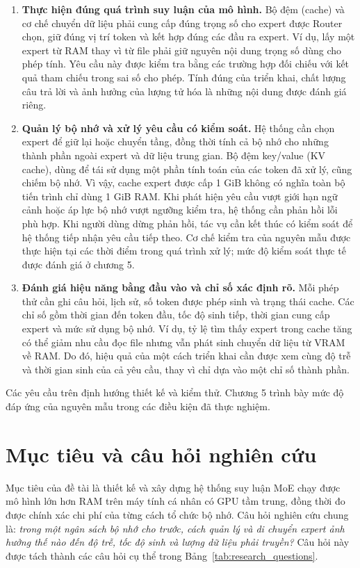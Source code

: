 \begin{enumerate}
\item \textbf{Thực hiện đúng quá trình suy luận của mô hình.} Bộ đệm (cache) và cơ chế chuyển dữ liệu phải cung cấp đúng trọng số cho expert được Router chọn, giữ đúng vị trí token và kết hợp đúng các đầu ra expert. Ví dụ, lấy một expert từ RAM thay vì từ file phải giữ nguyên nội dung trọng số dùng cho phép tính. Yêu cầu này được kiểm tra bằng các trường hợp đối chiếu với kết quả tham chiếu trong sai số cho phép. Tính đúng của triển khai, chất lượng câu trả lời và ảnh hưởng của lượng tử hóa là những nội dung được đánh giá riêng.
\item \textbf{Quản lý bộ nhớ và xử lý yêu cầu có kiểm soát.} Hệ thống cần chọn expert để giữ lại hoặc chuyển tầng, đồng thời tính cả bộ nhớ cho những thành phần ngoài expert và dữ liệu trung gian. Bộ đệm key/value (KV cache), dùng để tái sử dụng một phần tính toán của các token đã xử lý, cũng chiếm bộ nhớ. Vì vậy, cache expert được cấp 1 GiB không có nghĩa toàn bộ tiến trình chỉ dùng 1 GiB RAM. Khi phát hiện yêu cầu vượt giới hạn ngữ cảnh hoặc áp lực bộ nhớ vượt ngưỡng kiểm tra, hệ thống cần phản hồi lỗi phù hợp. Khi người dùng dừng phản hồi, tác vụ cần kết thúc có kiểm soát để hệ thống tiếp nhận yêu cầu tiếp theo. Cơ chế kiểm tra của nguyên mẫu được thực hiện tại các thời điểm trong quá trình xử lý; mức độ kiểm soát thực tế được đánh giá ở chương 5.
\item \textbf{Đánh giá hiệu năng bằng đầu vào và chỉ số xác định rõ.} Mỗi phép thử cần ghi câu hỏi, lịch sử, số token được phép sinh và trạng thái cache. Các chỉ số gồm thời gian đến token đầu, tốc độ sinh tiếp, thời gian cung cấp expert và mức sử dụng bộ nhớ. Ví dụ, tỷ lệ tìm thấy expert trong cache tăng có thể giảm nhu cầu đọc file nhưng vẫn phát sinh chuyển dữ liệu từ VRAM về RAM. Do đó, hiệu quả của một cách triển khai cần được xem cùng độ trễ và thời gian sinh của cả yêu cầu, thay vì chỉ dựa vào một chỉ số thành phần.
\end{enumerate}

Các yêu cầu trên định hướng thiết kế và kiểm thử. Chương 5 trình bày mức độ đáp ứng của nguyên mẫu trong các điều kiện đã thực nghiệm.

\section{Mục tiêu và câu hỏi nghiên cứu}

Mục tiêu của đề tài là thiết kế và xây dựng hệ thống suy luận MoE chạy được mô hình lớn hơn RAM trên máy tính cá nhân có GPU tầm trung, đồng thời đo được chính xác chi phí của từng cách tổ chức bộ nhớ. Câu hỏi nghiên cứu chung là: \textit{trong một ngân sách bộ nhớ cho trước, cách quản lý và di chuyển expert ảnh hưởng thế nào đến độ trễ, tốc độ sinh và lượng dữ liệu phải truyền?} Câu hỏi này được tách thành các câu hỏi cụ thể trong Bảng~\ref{tab:research_questions}.

